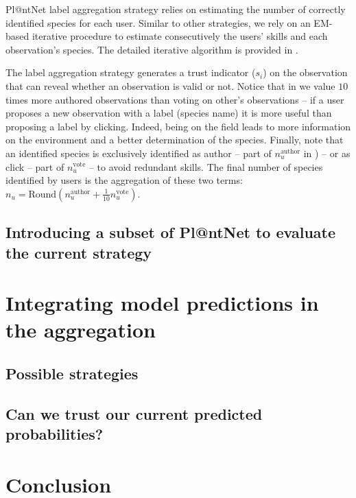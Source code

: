 Pl@ntNet label aggregation strategy relies on estimating the number of correctly identified species for each user.
Similar to other strategies, we rely on an EM-based iterative procedure \citep{Dempster_Laird_Rubin77} to estimate consecutively the users' skills and each observation's species. The detailed iterative algorithm is provided in .

The label aggregation strategy generates a trust indicator ($s_i$) on the observation that can reveal whether an observation is valid or not.
Notice that in  we value $10$ times more authored observations than voting on other's observations -- if a user proposes a new observation with a label (species name) it is more useful than proposing a label by clicking.
Indeed, being on the field leads to more information on the environment and a better determination of the species.
Finally, note that an identified species is exclusively identified as author -- part of $n_u^\text{author}$ in ) -- or as click -- part of $n_u^\text{vote}$ -- to avoid redundant skills.
The final number of species identified by users is the aggregation of these two terms: $n_u = \mathrm{Round}\left(n_u^\text{author} + \frac{1}{10}n_u^\text{vote}\right)$.


\subsection{Introducing a subset of Pl@ntNet to evaluate the current strategy}

\section{Integrating model predictions in the aggregation}

\subsection{Possible strategies}

\subsection{Can we trust our current predicted probabilities?}

\section{Conclusion}